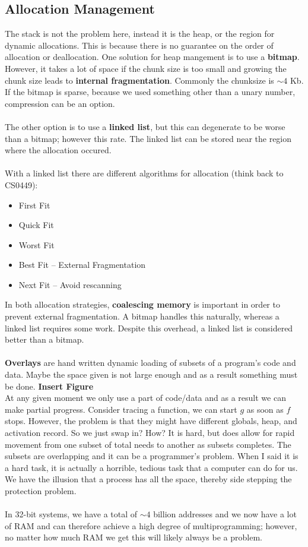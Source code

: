\documentclass[../base_file/cs1550_notes.tex]{subfiles}
\begin{document}
\subsection{Allocation Management}
The stack is not the problem here, instead it is the heap, or the region for dynamic allocations. 
This is because there is no guarantee on the order of allocation or deallocation.  One solution 
for heap mangement is to use a \textbf{bitmap}.  However, it takes a lot of space if the chunk
size is too small and growing the chunk size leads to \textbf{internal fragmentation}.  Commonly
the chunksize is $\sim4$ Kb.  If the bitmap is sparse, because we used something other than a
unary number, compression can be an option.\\\\The other option is to use a \textbf{linked list},
but this can degenerate to be worse than a bitmap; however this rate.  The linked list can be
stored near the region where the allocation occured.\\\\
With a linked list there are different algorithms for allocation (think back to CS0449):
\begin{itemize}
	\item First Fit
	\item Quick Fit
	\item Worst Fit
	\item Best Fit -- External Fragmentation
	\item Next Fit -- Avoid rescanning
\end{itemize}
In both allocation strategies, \textbf{coalescing memory} is important in order to prevent
external fragmentation.  A bitmap handles this naturally, whereas a linked list requires some work.
Despite this overhead, a linked list is considered better than a bitmap.\\\\
\textbf{Overlays} are hand written dynamic loading of subsets of a program's code and data.  Maybe
the space given is not large enough and as a result something must be done.  \textbf{Insert Figure}\\
At any given moment we only use a part of code/data and as a result we can make partial progress. 
Consider tracing a function, we can start $g$ as soon as $f$ stops.  However, the problem is that
they might have different globals, heap, and activation record.  So we just swap in? How?  It is hard,
but does allow for rapid movement from one subset of total needs to another as subsets completes.
The subsets are overlapping and it can be a programmer's problem.  When I said it is a hard task, it 
is actually a horrible, tedious task that a computer can do for us.
We have the illusion that a process has all the space, thereby side stepping the protection problem.\\\\
In 32-bit systems, we have a total of $\sim4$ billion addresses and we now have a lot of RAM and can
therefore achieve a high degree of multiprogramming; however, no matter how much RAM we get this will
likely always be a problem.
\end{document}
